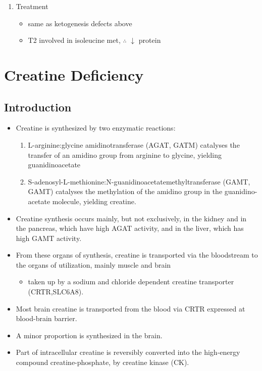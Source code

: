 \documentclass{scrartcl}
\begin{document}
\begin{enumerate}
\item Treatment
\label{sec:orgbdc4663}
\begin{itemize}
\item same as ketogenesis defects above
\item T2 involved in isoleucine met, \(\therefore\) \(\downarrow\) protein
\end{itemize}
\end{enumerate}
\section{Creatine Deficiency}
\label{sec:orgc522eca}
\subsection{Introduction}
\label{sec:org53daf26}
\begin{itemize}
\item Creatine is synthesized by two enzymatic reactions:
\begin{enumerate}
\item L-arginine:glycine amidinotransferase (AGAT, GATM) catalyses the
transfer of an amidino group from arginine to glycine, yielding
guanidinoacetate
\item S-adenosyl-L-methionine:N-guanidinoacetatemethyltransferase
(GAMT, GAMT) catalyses the methylation of the amidino group in
the guanidino-acetate molecule, yielding creatine.
\end{enumerate}

\item Creatine synthesis occurs mainly, but not exclusively, in the kidney
and in the pancreas, which have high AGAT activity, and in the
liver, which has high GAMT activity.

\item From these organs of synthesis, creatine is transported via the
bloodstream to the organs of utilization, mainly muscle and brain
\begin{itemize}
\item taken up by a sodium and chloride dependent creatine transporter
(CRTR,SLC6A8).
\end{itemize}

\item Most brain creatine is transported from the blood via CRTR expressed
at blood-brain barrier.
\item A minor proportion is synthesized in the brain.

\item Part of intracellular creatine is reversibly converted into the
high-energy compound creatine-phosphate, by creatine kinase (CK).


\end{itemize}
\end{document}
